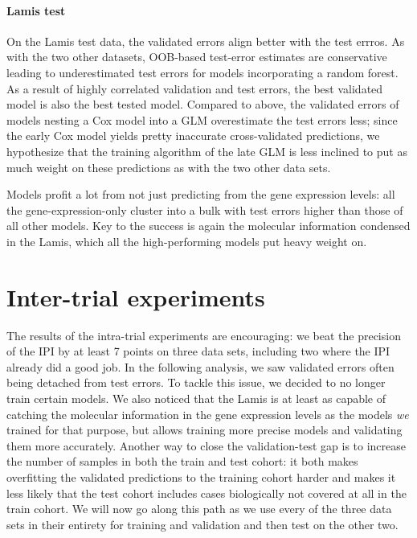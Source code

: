 \paragraph{Lamis test}

On the Lamis test data, the validated errors align better with the test errros. As with the two other 
datasets, OOB-based test-error estimates are conservative leading to underestimated test errors 
for models incorporating a random forest. As a result of highly correlated validation and test 
errors, the best validated model is also the best tested model. Compared to above, the validated errors 
of models nesting a Cox model into a GLM overestimate the test errors less; since the early Cox 
model yields pretty inaccurate cross-validated predictions, we hypothesize that the training 
algorithm of the late GLM is less inclined to put as much weight on these predictions as with the 
two other data sets.

Models profit a lot from not just predicting from the gene expression levels: all the 
gene-expression-only cluster into a bulk with test errors higher than those of all other models. 
Key to the success is again the molecular information condensed in the Lamis, which all the 
high-performing models put heavy weight on.

\section{Inter-trial experiments}

The results of the intra-trial experiments are encouraging: we beat the precision of the IPI by 
at least \num{7} points on three data sets, including two where the IPI already did a good job. 
In the following analysis, we saw validated errors often being detached from test errors. To tackle 
this issue, we decided to no longer train certain models. We also noticed that the Lamis is at least 
as capable of catching the molecular information in the gene expression levels as the models
\textit{we} trained for that purpose, but allows training more precise models and validating them 
more accurately. Another way to close the validation-test gap is to increase the number of samples 
in both the train and test cohort: it both makes overfitting the validated predictions to the 
training cohort harder and makes it less likely that the test cohort includes cases biologically 
not covered at all in the train cohort. We will now go along this path as we use every of the 
three data sets in their entirety for training and validation and then test on the other two.

